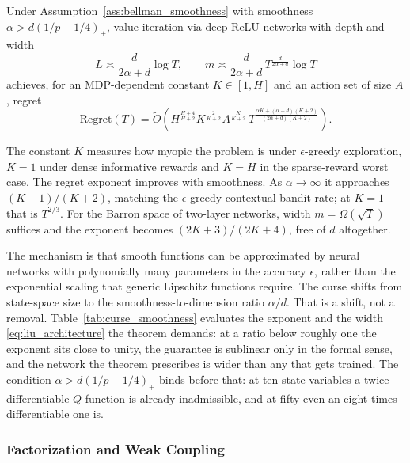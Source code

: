 \begin{theorem}
\label{thm:deep_rl_regret}
Under Assumption~\ref{ass:bellman_smoothness} with smoothness $\alpha > d(1/p - 1/4)_+$, value iteration via deep ReLU networks with depth and width
\begin{equation}
L \asymp \frac{d}{2\alpha + d} \log T, \qquad m \asymp \frac{d}{2\alpha + d}\, T^{\frac{d}{2\alpha + d}} \log T
\label{eq:liu_architecture}
\end{equation}
achieves, for an MDP-dependent constant $K \in [1, H]$ and an action set of size $A$, regret
\begin{equation}
\text{Regret}(T) = \tilde{O}\left( H^{\frac{H+4}{H+2}} K^{\frac{2}{K+2}} A^{\frac{K}{K+2}}\, T^{\frac{\alpha K + (\alpha + d)(K+2)}{(2\alpha + d)(K+2)}} \right).
\label{eq:liu_regret}
\end{equation}
\end{theorem}

The constant $K$ measures how myopic the problem is under $\epsilon$-greedy exploration, $K = 1$ under dense informative rewards and $K = H$ in the sparse-reward worst case. The regret exponent improves with smoothness. As $\alpha \to \infty$ it approaches $(K+1)/(K+2)$, matching the $\epsilon$-greedy contextual bandit rate; at $K = 1$ that is $T^{2/3}$. For the Barron space of two-layer networks, width $m = \Omega(\sqrt{T})$ suffices and the exponent becomes $(2K+3)/(2K+4)$, free of $d$ altogether.

The mechanism is that smooth functions can be approximated by neural networks with polynomially many parameters in the accuracy $\epsilon$, rather than the exponential scaling that generic Lipschitz functions require. The curse shifts from state-space size to the smoothness-to-dimension ratio $\alpha/d$. That is a shift, not a removal. Table~\ref{tab:curse_smoothness} evaluates the exponent and the width \eqref{eq:liu_architecture} the theorem demands: at a ratio below roughly one the exponent sits close to unity, the guarantee is sublinear only in the formal sense, and the network the theorem prescribes is wider than any that gets trained. The condition $\alpha > d(1/p - 1/4)_+$ binds before that: at ten state variables a twice-differentiable $Q$-function is already inadmissible, and at fifty even an eight-times-differentiable one is.




\subsubsection{Factorization and Weak Coupling}
\label{sec:factored_pathway}

